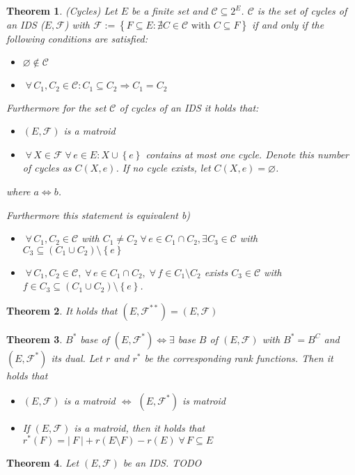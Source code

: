\documentclass{article}
\newtheorem{theorem}{Theorem}
\newcommand{\card}[1]{\left|\:\!#1\:\!\right|}
\newcommand{\set}[1]{\left\{#1\right\}}
\newcommand{\fall}{\;\forall\,}
\begin{document}
\begin{theorem}
  \label{satz-8.8}
  (Cycles)
  Let $E$ be a finite set and $\mathcal{C} \subseteq 2^E$. $\mathcal{C}$ is the set of cycles of an IDS ($E, \mathcal{F}$) with $\mathcal{F} := \set{F \subseteq E: \nexists C \in \mathcal{C} \text{ with } C \subseteq F}$ if and only if the following conditions are satisfied:

  \begin{itemize}
    \item[(C1)] $\diameter \notin \mathcal{C}$
    \item[(C2)] $\fall C_1, C_2 \in \mathcal{C}: C_1 \subseteq C_2 \Rightarrow C_1 = C_2$
  \end{itemize}

  Furthermore for the set $\mathcal{C}$ of cycles of an IDS it holds that:
  \begin{itemize}
    \item[a)] $(E, \mathcal{F})$ is a matroid
    \item[b)] $\fall X \in \mathcal{F} \fall e \in E: X \cup \set{e}$ contains at most one cycle. Denote this number of cycles as $C(X, e)$. If no cycle exists, let $C(X, e) = \diameter$.
  \end{itemize}
  where $a \Leftrightarrow b$.

  Furthermore this statement is equivalent b)
  \begin{itemize}
    \item[(C3)] $\fall C_1, C_2 \in \mathcal{C}$ with $C_1 \neq C_2 \fall e \in C_1 \cap C_2, \exists C_3 \in \mathcal{C}$ with $C_3 \subseteq (C_1 \cup C_2) \setminus \set{e}$
    \item[(C4)] $\fall C_1, C_2 \in \mathcal{C}, \fall e \in C_1 \cap C_2, \fall f \in C_1 \setminus C_2$ exists $C_3 \in \mathcal{C}$ with $f \in C_3 \subseteq (C_1 \cup C_2) \setminus \set{e}$.
  \end{itemize}
\end{theorem}
\begin{theorem}
  \label{proposition-8.9}
  It holds that $(E, \mathcal{F}^{**}) = (E, \mathcal{F})$
\end{theorem}
\begin{theorem}
  \label{corollary-8.10}
  $B^*$ base of $(E, \mathcal{F}^*) \Leftrightarrow \exists$ base $B$ of $(E, \mathcal{F})$ with $B^* = B^C$ and $(E, \mathcal{F}^*)$ its dual. Let $r$ and $r^*$ be the corresponding rank functions.
  Then it holds that
  \begin{itemize}
    \item[a)] $(E, \mathcal{F})$ is a matroid $\Leftrightarrow$ $(E, \mathcal{F}^*)$ is matroid
    \item[b)] If $(E, \mathcal{F})$ is a matroid, then it holds that $r^*(F) = \card{F} + r(E \setminus F) - r(E) \fall F \subseteq E$
  \end{itemize}
\end{theorem}
\begin{theorem}
  \label{satz-8.10}
  Let $(E, \mathcal{F})$ be an IDS. TODO
\end{theorem}
\end{document}
